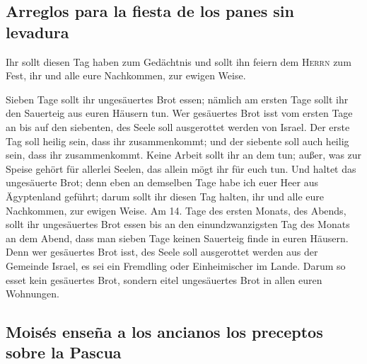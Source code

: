 \hypertarget{arreglos-para-la-fiesta-de-los-panes-sin-levadura}{%
\subsection{Arreglos para la fiesta de los panes sin
levadura}\label{arreglos-para-la-fiesta-de-los-panes-sin-levadura}}

 Ihr sollt diesen Tag haben zum Gedächtnis und sollt ihn
feiern dem \textsc{Herrn} zum Fest, ihr und alle eure Nachkommen, zur
ewigen Weise.

 Sieben Tage sollt ihr ungesäuertes Brot essen; nämlich
am ersten Tage sollt ihr den Sauerteig aus euren Häusern tun. Wer
gesäuertes Brot isst vom ersten Tage an bis auf den siebenten, des Seele
soll ausgerottet werden von Israel.  Der erste Tag soll
heilig sein, dass ihr zusammenkommt; und der siebente soll auch heilig
sein, dass ihr zusammenkommt. Keine Arbeit sollt ihr an dem tun; außer,
was zur Speise gehört für allerlei Seelen, das allein mögt ihr für euch
tun.  Und haltet das ungesäuerte Brot; denn eben an
demselben Tage habe ich euer Heer aus Ägyptenland geführt; darum sollt
ihr diesen Tag halten, ihr und alle eure Nachkommen, zur ewigen Weise.
 Am 14. Tage des ersten Monats, des Abends, sollt ihr
ungesäuertes Brot essen bis an den einundzwanzigsten Tag des Monats an
dem Abend,  dass man sieben Tage keinen Sauerteig finde
in euren Häusern. Denn wer gesäuertes Brot isst, des Seele soll
ausgerottet werden aus der Gemeinde Israel, es sei ein Fremdling oder
Einheimischer im Lande.  Darum so esset kein gesäuertes
Brot, sondern eitel ungesäuertes Brot in allen euren Wohnungen.

\hypertarget{moisuxe9s-enseuxf1a-a-los-ancianos-los-preceptos-sobre-la-pascua}{%
\subsection{Moisés enseña a los ancianos los preceptos sobre la
Pascua}\label{moisuxe9s-enseuxf1a-a-los-ancianos-los-preceptos-sobre-la-pascua}}

